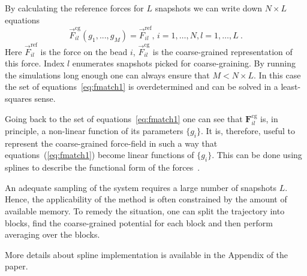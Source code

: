 By calculating the reference forces for $L$ snapshots we can write down $N \times L$ equations
%
\begin{equation}
  {\vec F}_{il}^\text{cg}(g_1,...,g_M)=\vec F_{il}^\text{ref},\, i=1,\dots,N, l=1,\dots,L~.
  \label{eq:fmatch1}
\end{equation}
%
Here ${\vec F}_{il}^\text{ref}$ is the force on the bead $i$, ${\vec F}_{il}^\text{cg} $ is the coarse-grained representation of this force. Index $l$ enumerates snapshots picked for coarse-graining. By running the simulations long enough one can always ensure that $M < N \times L$. In this case the set of equations~\ref{eq:fmatch1} is overdetermined and can be solved in a least-squares sense.

Going back to the set of equations~\ref{eq:fmatch1} one can see that ${\bm F}_{il}^\text{cg}$ is, in principle, a non-linear function of its parameters $\{g_i\}$. It is, therefore, useful to represent the coarse-grained force-field in such a way that equations~(\ref{eq:fmatch1}) become linear functions of $\{g_i\}$. This can be done using splines to describe the functional form of the forces~\cite{Izvekov:2005}.

An adequate sampling of the system requires a large number of snapshots $L$. Hence, the applicability of the method is often constrained by the amount of available memory. To remedy the situation, one can split the trajectory into blocks, find the coarse-grained potential for each block and then perform averaging over the blocks. 

More details about spline implementation is available in the Appendix of the \votca paper.